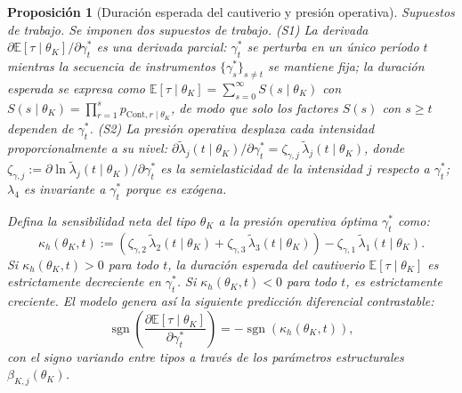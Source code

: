 \documentclass[review,authoryear,12pt]{elsarticle}
\theoremstyle{plain}
\newtheorem{proposition}[theorem]{Proposición}
\theoremstyle{definition}
\newcommand{\1}{\mathbf{1}}
\begin{document}
\begin{proposition}[Duración esperada del cautiverio y presión operativa]
\label{prop:expected-captivity-gamma}
\noindent\textit{Supuestos de trabajo.} Se imponen dos supuestos de trabajo. \textup{(S1)} La derivada $\partial\mathbb{E}[\tau\mid\theta_K]/\partial\gamma_t^\ast$ es una derivada parcial: $\gamma_t^\ast$ se perturba en un único período $t$ mientras la secuencia de instrumentos $\{\gamma_s^\ast\}_{s\neq t}$ se mantiene fija; la duración esperada se expresa como $\mathbb{E}[\tau\mid\theta_K]=\sum_{s=0}^{\infty}S(s\mid\theta_K)$ con $S(s\mid\theta_K)=\prod_{r=1}^{s}p_{\mathrm{Cont},r\mid\theta_K}$, de modo que solo los factores $S(s)$ con $s\geq t$ dependen de $\gamma_t^\ast$. \textup{(S2)} La presión operativa desplaza cada intensidad proporcionalmente a su nivel: $\partial\tilde{\lambda}_j(t\mid\theta_K)/\partial\gamma_t^\ast=\zeta_{\gamma,j}\,\tilde{\lambda}_j(t\mid\theta_K)$, donde $\zeta_{\gamma,j}:=\partial\ln\tilde{\lambda}_j(t\mid\theta_K)/\partial\gamma_t^\ast$ es la semielasticidad de la intensidad $j$ respecto a $\gamma_t^\ast$; $\lambda_4$ es invariante a $\gamma_t^\ast$ porque es exógena.

\medskip
Defina la sensibilidad neta del tipo $\theta_K$ a la presión operativa óptima $\gamma_t^\ast$ como:
\begin{equation}
\label{eq:kappa-c}
\kappa_h(\theta_K, t) := \left( \zeta_{\gamma,2}\, \tilde{\lambda}_2(t \mid \theta_K) + \zeta_{\gamma,3}\, \tilde{\lambda}_3(t \mid \theta_K) \right) - \zeta_{\gamma,1}\, \tilde{\lambda}_1(t \mid \theta_K).
\end{equation}
Si $\kappa_h(\theta_K, t) > 0$ para todo $t$, la duración esperada del cautiverio $\mathbb{E}[\tau \mid \theta_K]$ es estrictamente decreciente en $\gamma_t^\ast$. Si $\kappa_h(\theta_K, t) < 0$ para todo $t$, es estrictamente creciente. El modelo genera así la siguiente predicción diferencial contrastable:
\begin{equation}
\operatorname{sgn} \left( \frac{\partial \mathbb{E}[\tau \mid \theta_K]}{\partial \gamma_t^\ast} \right) = - \operatorname{sgn}(\kappa_h(\theta_K, t)),
\end{equation}
con el signo variando entre tipos a través de los parámetros estructurales $\beta_{K,j}(\theta_K)$.
\end{proposition}
\end{document}
